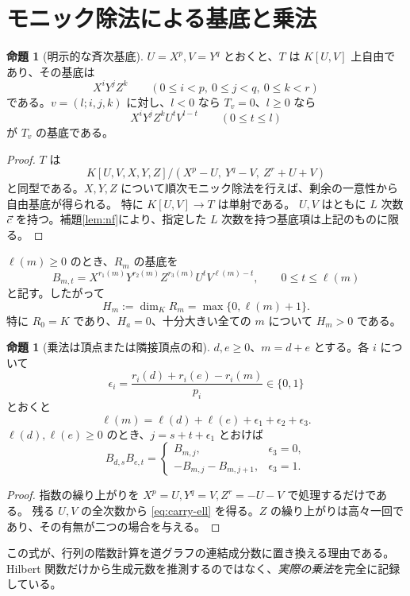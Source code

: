 \documentclass[11pt,a4paper]{ltjsarticle}
\numberwithin{equation}{section}
\theoremstyle{definition}
\newtheorem{proposition}[theorem]{命題}
\begin{document}
\section{モニック除法による基底と乗法}\label{sec:basis}
\begin{proposition}[明示的な斉次基底]\label{prop:basis}
$U=X^p,V=Y^q$ とおくと、$T$ は $K[U,V]$ 上自由であり、その基底は
\[
 X^iY^jZ^k\qquad(0\le i<p,\ 0\le j<q,\ 0\le k<r)
\]
である。$v=(l;i,j,k)$ に対し、$l<0$ なら $T_v=0$、$l\ge0$ なら
\[
 X^iY^jZ^k U^tV^{l-t}\qquad (0\le t\le l)
\]
が $T_v$ の基底である。
\end{proposition}
\begin{proof}
$T$ は
\[
 K[U,V,X,Y,Z]/(X^p-U,\ Y^q-V,\ Z^r+U+V)
\]
と同型である。$X,Y,Z$ について順次モニック除法を行えば、剰余の一意性から自由基底が得られる。
特に $K[U,V]\to T$ は単射である。
$U,V$ はともに $L$ 次数 $\vec c$ を持つ。補題\ref{lem:nf}により、指定した $L$ 次数を持つ基底項は上記のものに限る。
\end{proof}
$\ell(m)\ge0$ のとき、$R_m$ の基底を
\begin{equation}\label{eq:bmt}
 B_{m,t}=X^{r_1(m)}Y^{r_2(m)}Z^{r_3(m)}U^tV^{\ell(m)-t},
 \qquad 0\le t\le\ell(m)
\end{equation}
と記す。したがって
\begin{equation}\label{eq:hilbert-floor}
 H_m:=\dim_KR_m=\max\{0,\ell(m)+1\}.
\end{equation}
特に $R_0=K$ であり、$H_a=0$、十分大きい全ての $m$ について $H_m>0$ である。

\begin{proposition}[乗法は頂点または隣接頂点の和]\label{prop:mult}
$d,e\ge0$、$m=d+e$ とする。各 $i$ について
\[
 \epsilon_i=\frac{r_i(d)+r_i(e)-r_i(m)}{p_i}\in\{0,1\}
\]
とおくと
\begin{equation}\label{eq:carry-ell}
 \ell(m)=\ell(d)+\ell(e)+\epsilon_1+\epsilon_2+\epsilon_3.
\end{equation}
$\ell(d),\ell(e)\ge0$ のとき、$j=s+t+\epsilon_1$ とおけば
\begin{equation}\label{eq:mult}
 B_{d,s}B_{e,t}=
 \begin{cases}
 B_{m,j},&\epsilon_3=0,\\
 -B_{m,j}-B_{m,j+1},&\epsilon_3=1.
 \end{cases}
\end{equation}
\end{proposition}
\begin{proof}
指数の繰り上がりを $X^p=U,Y^q=V,Z^r=-U-V$ で処理するだけである。
残る $U,V$ の全次数から \eqref{eq:carry-ell} を得る。$Z$ の繰り上がりは高々一回であり、その有無が二つの場合を与える。
\end{proof}
この式が、行列の階数計算を道グラフの連結成分数に置き換える理由である。
Hilbert 関数だけから生成元数を推測するのではなく、\emph{実際の乗法}を完全に記録している。
\end{document}
